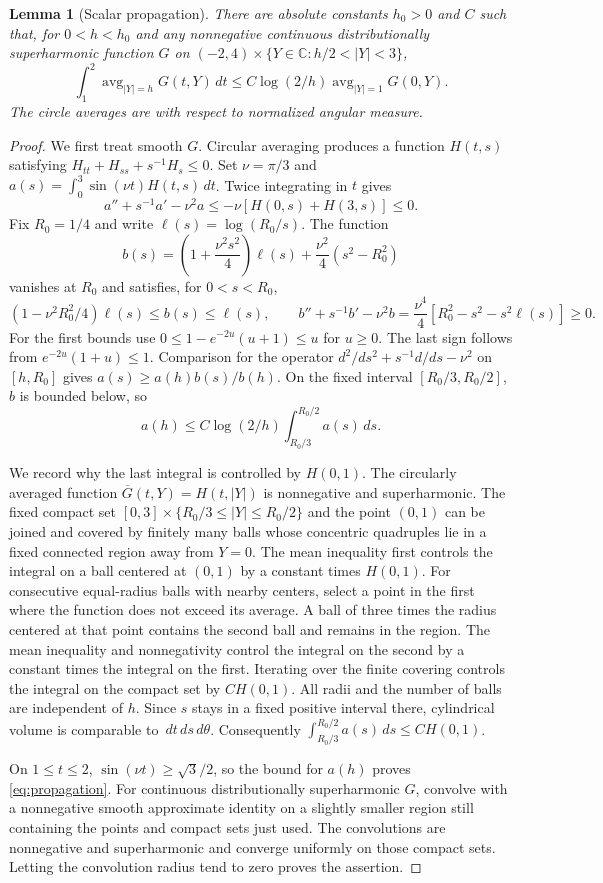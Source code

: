 \documentclass[11pt]{article}
\newtheorem{lemma}{Lemma}
\numberwithin{equation}{section}
\newcommand{\C}{\mathbb C}
\newcommand{\dd}{\,d}
\begin{document}
\begin{lemma}[Scalar propagation]\label{lem:propagation}
There are absolute constants $h_0>0$ and $C$ such that, for
$0<h<h_0$ and any nonnegative continuous distributionally
superharmonic function $G$ on
$(-2,4)\times\{Y\in\C:h/2<|Y|<3\}$,
\begin{equation}\label{eq:propagation}
 \int_1^2\operatorname{avg}_{|Y|=h}G(t,Y)\dd t
 \le C\log(2/h)\operatorname{avg}_{|Y|=1}G(0,Y).
\end{equation}
The circle averages are with respect to normalized angular measure.
\end{lemma}
\begin{proof}
We first treat smooth $G$. Circular averaging produces a function
$H(t,s)$ satisfying
$H_{tt}+H_{ss}+s^{-1}H_s\le0$.
Set $\nu=\pi/3$ and
$a(s)=\int_0^3\sin(\nu t)H(t,s)\dd t$.
Twice integrating in $t$ gives
\[
 a''+s^{-1}a'-\nu^2a
 \le-\nu[H(0,s)+H(3,s)]\le0.
\]
Fix $R_0=1/4$ and write $\ell(s)=\log(R_0/s)$.
The function
\[
 b(s)=\left(1+\frac{\nu^2s^2}{4}\right)\ell(s)
                       +\frac{\nu^2}{4}(s^2-R_0^2)
\]
vanishes at $R_0$ and satisfies, for $0<s<R_0$,
\[
 (1-\nu^2R_0^2/4)\ell(s)\le b(s)\le\ell(s),\qquad
 b''+s^{-1}b'-\nu^2b
 =\frac{\nu^4}{4}
       [R_0^2-s^2-s^2\ell(s)]\ge0.
\]
For the first bounds use
$0\le1-e^{-2u}(u+1)\le u$ for $u\ge0$.
The last sign follows from $e^{-2u}(1+u)\le1$.
Comparison for the operator
$d^2/ds^2+s^{-1}d/ds-\nu^2$ on $[h,R_0]$ gives
$a(s)\ge a(h)b(s)/b(h)$.
On the fixed interval $[R_0/3,R_0/2]$, $b$ is bounded below,
so
\[
 a(h)\le C\log(2/h)\int_{R_0/3}^{R_0/2}a(s)\dd s.
\]

We record why the last integral is controlled by $H(0,1)$.
The circularly averaged function
$\overline G(t,Y)=H(t,|Y|)$ is nonnegative and superharmonic.
The fixed compact set
$[0,3]\times\{R_0/3\le|Y|\le R_0/2\}$ and the point $(0,1)$
can be joined and covered by finitely many balls whose concentric
quadruples lie in a fixed connected region away from $Y=0$.
The mean inequality first controls the integral on a ball centered
at $(0,1)$ by a constant times $H(0,1)$.
For consecutive equal-radius balls with nearby centers, select a
point in the first where the function does not exceed its average.
A ball of three times the radius centered at that point contains
the second ball and remains in the region. The mean inequality and
nonnegativity control the integral on the second by a constant times
the integral on the first. Iterating over the finite covering
controls the integral on the compact set by $CH(0,1)$.
All radii and the number of balls are independent of $h$.
Since $s$ stays in a fixed positive interval there, cylindrical
volume is comparable to $\dd t\dd s\dd\theta$.
Consequently
$\int_{R_0/3}^{R_0/2}a(s)\dd s\le CH(0,1)$.

On $1\le t\le2$, $\sin(\nu t)\ge\sqrt3/2$, so the bound for $a(h)$
proves \eqref{eq:propagation}.
For continuous distributionally superharmonic $G$, convolve with a
nonnegative smooth approximate identity on a slightly smaller
region still containing the points and compact sets just used.
The convolutions are nonnegative and superharmonic and converge
uniformly on those compact sets. Letting the convolution radius
tend to zero proves the assertion.
\end{proof}
\end{document}
